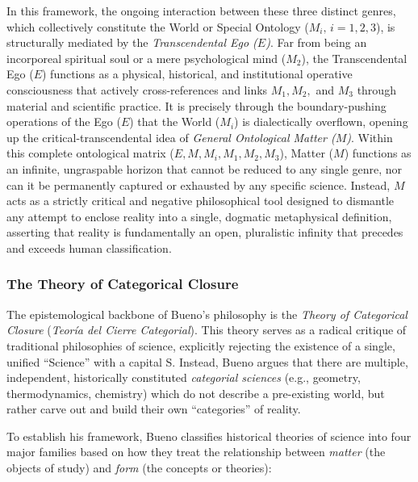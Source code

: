 \documentclass[11pt, a4paper]{article}
\begin{document}
In this framework, the ongoing interaction between these three distinct genres, which collectively constitute the World or Special Ontology ($M_i,\, i=1,2,3$), is structurally mediated by the \emph{Transcendental Ego ($E$)}. Far from being an incorporeal spiritual soul or a mere psychological mind ($M_2$), the Transcendental Ego ($E$) functions as a physical, historical, and institutional operative consciousness that actively cross-references and links $M_1, M_2,$ and $M_3$ through material and scientific practice. It is precisely through the boundary-pushing operations of the Ego ($E$) that the World ($M_i$) is dialectically overflown, opening up the critical-transcendental idea of \emph{General Ontological Matter ($M$)}. Within this complete ontological matrix ($E, M, M_i, M_1, M_2, M_3$), Matter ($M$) functions as an infinite, ungraspable horizon that cannot be reduced to any single genre, nor can it be permanently captured or exhausted by any specific science. Instead, $M$ acts as a strictly critical and negative philosophical tool designed to dismantle any attempt to enclose reality into a single, dogmatic metaphysical definition, asserting that reality is fundamentally an open, pluralistic infinity that precedes and exceeds human classification.



\subsubsection{The Theory of Categorical Closure}

The epistemological backbone of Bueno's philosophy is the \textit{Theory of Categorical Closure} (\emph{Teoría del Cierre Categorial}). This theory serves as a radical critique of traditional philosophies of science, explicitly rejecting the existence of a single, unified ``Science'' with a capital S. Instead, Bueno argues that there are multiple, independent, historically constituted \emph{categorial sciences} (e.g., geometry, thermodynamics, chemistry) which do not describe a pre-existing world, but rather carve out and build their own ``categories'' of reality.

To establish his framework, Bueno classifies historical theories of science into four major families based on how they treat the relationship between \emph{matter} (the objects of study) and \emph{form} (the concepts or theories):
\end{document}
